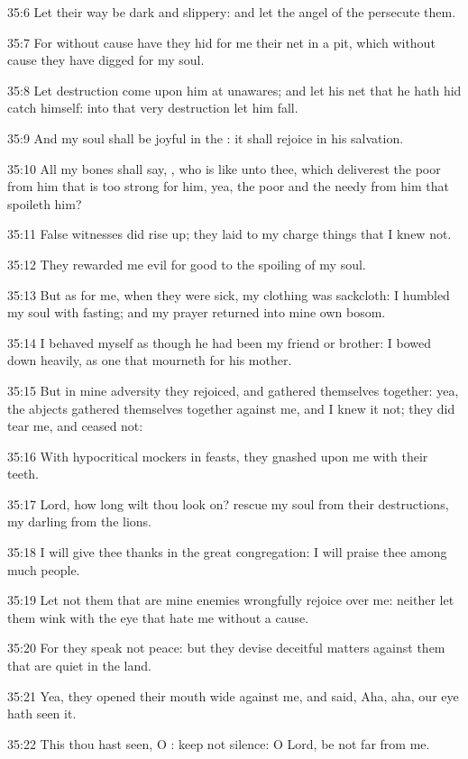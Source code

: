 35:6 Let their way be dark and slippery: and let the angel of the \LORD persecute them.

35:7 For without cause have they hid for me their net in a pit, which without cause they have digged for my soul.

35:8 Let destruction come upon him at unawares; and let his net that he hath hid catch himself: into that very destruction let him fall.

35:9 And my soul shall be joyful in the \LORD: it shall rejoice in his salvation.

35:10 All my bones shall say, \LORD, who is like unto thee, which deliverest the poor from him that is too strong for him, yea, the poor and the needy from him that spoileth him?

35:11 False witnesses did rise up; they laid to my charge things that I knew not.

35:12 They rewarded me evil for good to the spoiling of my soul.

35:13 But as for me, when they were sick, my clothing was sackcloth: I humbled my soul with fasting; and my prayer returned into mine own bosom.

35:14 I behaved myself as though he had been my friend or brother: I bowed down heavily, as one that mourneth for his mother.

35:15 But in mine adversity they rejoiced, and gathered themselves together: yea, the abjects gathered themselves together against me, and I knew it not; they did tear me, and ceased not:

35:16 With hypocritical mockers in feasts, they gnashed upon me with their teeth.

35:17 Lord, how long wilt thou look on? rescue my soul from their destructions, my darling from the lions.

35:18 I will give thee thanks in the great congregation: I will praise thee among much people.

35:19 Let not them that are mine enemies wrongfully rejoice over me: neither let them wink with the eye that hate me without a cause.

35:20 For they speak not peace: but they devise deceitful matters against them that are quiet in the land.

35:21 Yea, they opened their mouth wide against me, and said, Aha, aha, our eye hath seen it.

35:22 This thou hast seen, O \LORD: keep not silence: O Lord, be not far from me.

